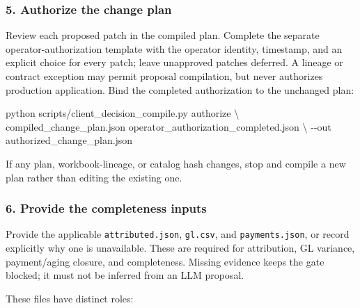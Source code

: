 \documentclass[
]{article}
\newenvironment{Shaded}{}{}
\newcommand{\AttributeTok}[1]{\textcolor[rgb]{0.49,0.56,0.16}{#1}}
\newcommand{\DataTypeTok}[1]{\textcolor[rgb]{0.56,0.13,0.00}{#1}}
\newcommand{\ExtensionTok}[1]{#1}
\newcommand{\NormalTok}[1]{#1}
\begin{document}
\subsubsection{5. Authorize the change
plan}\label{authorize-the-change-plan}

Review each proposed patch in the compiled plan. Complete the separate
operator-authorization template with the operator identity, timestamp,
and an explicit choice for every patch; leave unapproved patches
deferred. A lineage or contract exception may permit proposal
compilation, but never authorizes production application. Bind the
completed authorization to the unchanged plan:

\begin{Shaded}
\begin{Highlighting}[]
\ExtensionTok{python}\NormalTok{ scripts/client\_decision\_compile.py authorize }\DataTypeTok{\textbackslash{}}
\NormalTok{  compiled\_change\_plan.json operator\_authorization\_completed.json }\DataTypeTok{\textbackslash{}}
  \AttributeTok{{-}{-}out}\NormalTok{ authorized\_change\_plan.json}
\end{Highlighting}
\end{Shaded}

If any plan, workbook-lineage, or catalog hash changes, stop and compile
a new plan rather than editing the existing one.

\subsubsection{6. Provide the completeness
inputs}\label{provide-the-completeness-inputs}

Provide the applicable \texttt{attributed.json}, \texttt{gl.csv}, and
\texttt{payments.json}, or record explicitly why one is unavailable.
These are required for attribution, GL variance, payment/aging closure,
and completeness. Missing evidence keeps the gate blocked; it must not
be inferred from an LLM proposal.

These files have distinct roles:
\end{document}
